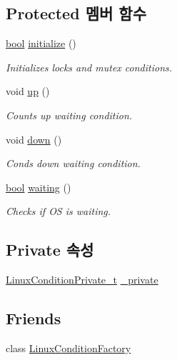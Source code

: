 \subsection*{Protected 멤버 함수}
\begin{DoxyCompactItemize}
\item 
\hyperlink{avb__gptp_8h_af6a258d8f3ee5206d682d799316314b1}{bool} \hyperlink{class_linux_condition_ab3e7cc706c522b3231f9156bba461436}{initialize} ()
\begin{DoxyCompactList}\small\item\em Initializes locks and mutex conditions. \end{DoxyCompactList}\item 
void \hyperlink{class_o_s_condition_a0a1d932d49dd1079cfd0964b11adc7a0}{up} ()
\begin{DoxyCompactList}\small\item\em Counts up waiting condition. \end{DoxyCompactList}\item 
void \hyperlink{class_o_s_condition_a6663cf1e20c2f8162d29d31c8f6324e6}{down} ()
\begin{DoxyCompactList}\small\item\em Conds down waiting condition. \end{DoxyCompactList}\item 
\hyperlink{avb__gptp_8h_af6a258d8f3ee5206d682d799316314b1}{bool} \hyperlink{class_o_s_condition_a048a0b424dfef3a139f43ad4ae9c1904}{waiting} ()
\begin{DoxyCompactList}\small\item\em Checks if OS is waiting. \end{DoxyCompactList}\end{DoxyCompactItemize}
\subsection*{Private 속성}
\begin{DoxyCompactItemize}
\item 
\hyperlink{linux__hal__common_8hpp_aa359692ac94b7a16c2eabe2a3bc3b7fa}{Linux\+Condition\+Private\+\_\+t} \hyperlink{class_linux_condition_a3d5dfb7072495e32222b0bd0ac3975bb}{\+\_\+private}
\end{DoxyCompactItemize}
\subsection*{Friends}
\begin{DoxyCompactItemize}
\item 
class \hyperlink{class_linux_condition_a0e86a85a05713b069c8c32aae1221ee5}{Linux\+Condition\+Factory}
\end{DoxyCompactItemize}


